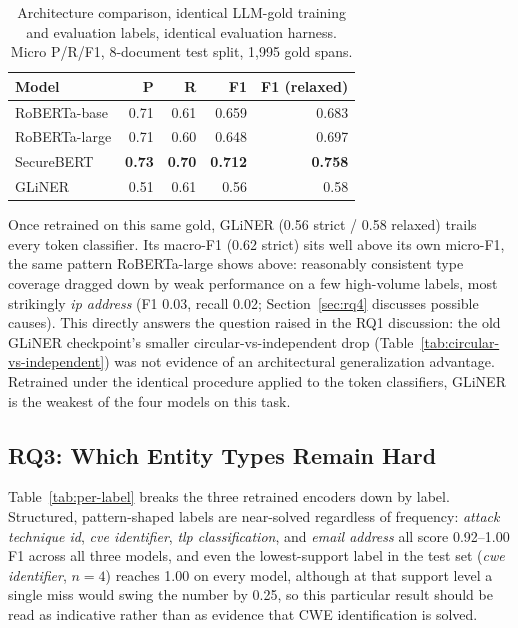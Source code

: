 \documentclass[11pt]{article}
\begin{document}
\begin{table}[t]
\centering
\small
\begin{tabular}{lrrrr}
\toprule
Model & P & R & F1 & F1 (relaxed) \\
\midrule
RoBERTa-base & 0.71 & 0.61 & 0.659 & 0.683 \\
RoBERTa-large & 0.71 & 0.60 & 0.648 & 0.697 \\
SecureBERT & \textbf{0.73} & \textbf{0.70} & \textbf{0.712} & \textbf{0.758} \\
GLiNER & 0.51 & 0.61 & 0.56 & 0.58 \\
\bottomrule
\end{tabular}
\caption{Architecture comparison, identical LLM-gold training and
evaluation labels, identical evaluation harness. Micro P/R/F1, 8-document
test split, 1{,}995 gold spans.}
\label{tab:architecture}
\end{table}

Once retrained on this same gold, GLiNER (0.56 strict / 0.58 relaxed) trails
every token classifier. Its macro-F1 (0.62 strict)
sits well above its own micro-F1, the same pattern RoBERTa-large shows
above: reasonably consistent type coverage dragged down by weak performance
on a few high-volume labels, most strikingly \emph{ip address} (F1 0.03,
recall 0.02; Section~\ref{sec:rq4} discusses possible causes). This directly
answers the question raised in the RQ1 discussion: the old GLiNER
checkpoint's smaller circular-vs-independent drop
(Table~\ref{tab:circular-vs-independent}) was not evidence of an
architectural generalization advantage. Retrained under the identical
procedure applied to the token classifiers, GLiNER is the weakest of the
four models on this task.

\subsection{RQ3: Which Entity Types Remain Hard}
\label{sec:rq3}

Table~\ref{tab:per-label} breaks the three retrained encoders down by label.
Structured, pattern-shaped labels are near-solved regardless of frequency:
\emph{attack technique id}, \emph{cve identifier}, \emph{tlp
classification}, and \emph{email address} all score 0.92--1.00 F1 across
all three models, and even the lowest-support label in the test set
(\emph{cwe identifier}, $n=4$) reaches 1.00 on every model, although at
that support level a single miss would swing the number by 0.25, so this
particular result should be read as indicative rather than as evidence that
CWE identification is solved.
\end{document}
